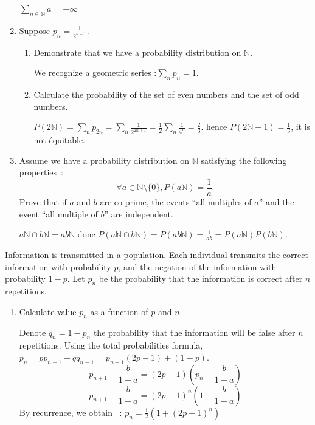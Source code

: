 \documentclass[a4paper,11pt]{exam}
\newcommand{\N}{\mathbb{N}}
\begin{document}
\begin{questions}
\begin{enumerate}
\begin{solution}
		$\sum_{n\in \N} a = +\infty$
	\end{solution}
	
	\item   Suppose  $p_n = \frac{1}{2^{n+1}} .$
	\begin{enumerate}
		\item  Demonstrate that we have a probability distribution on $\N$.
		\begin{solution}
			We recognize a geometric series :$\sum_n p_n =1$.
		\end{solution}
		\item Calculate the probability of the set of even numbers and the set of odd numbers. 
		
		\begin{solution}
			$ P(2\N) = \sum_n p_{2n} = \sum_n \frac{1}{2^{2n+1}} = \frac{1}{2}  \sum_n \frac{1}{4^{n}} = \frac{2}{3}$.
			hence $P(2\N +1) = \frac{1}{3}$, it is not équitable.
		\end{solution}
	\end{enumerate}
	\item Assume we have a probability distribution on $\N$
	satisfying the following properties~:
	\[\forall a\in \N\setminus\{0\}, P(a\N) = \frac{1}{a} .\]
	Prove that if $ a $ and $ b $ are co-prime, the events ``all multiples of $ a $'' and the event ``all multiple of $ b $'' are independent.
	
	\begin{solution}
		$a\N \cap b\N = ab \N$ donc $P(a\N \cap b\N) = P(ab \N) = \frac{1}{ab} = P(a\N)P(b\N)$.
	\end{solution}
\end{enumerate}



\question
Information is transmitted in a population.
Each individual transmits the correct information with probability $ p $, and the negation of the information with probability $ 1-p $.
Let $ p_n $ be the probability that the information is correct after $ n $ repetitions.

\begin{enumerate}
	\item Calculate value $p_n$ as a function of $p$ and $n$.
	
	\begin{solution}
		Denote $q_n=1-p_n$ the probability that the information will be false after
		$n$ repetitions.
		Using the total probabilities formula,
		$p_n=pp_{n-1}+qq_{n-1} = p_{n-1}(2p-1)+(1-p)$.
		\[
			p_{n+1}-\frac{b}{1-a}=(2p-1)(p_n-\frac{b}{1-a})
		\]
		\[
			p_{n+1}-\frac{b}{1-a}=(2p-1)^n(1-\frac{b}{1-a})
		\]
		By recurrence, we obtain ~:
		$p_n = \frac{1}{2}( 1+ (2p-1)^n)$
	\end{solution}
	

\end{enumerate}
\end{questions}
\end{document}
